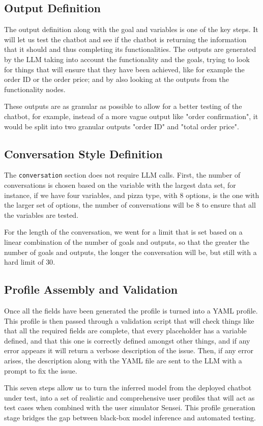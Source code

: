 \subsection{Output Definition}

The output definition along with the goal and variables is one of the key steps.
It will let us test the chatbot
and see if the chatbot is returning the information that it should
and thus completing its functionalities.
The outputs are generated by the \ac{LLM}
taking into account the functionality and the goals,
trying to look for things that will ensure that they have been achieved,
like for example the order ID or the order price;
and by also looking at the outputs from the functionality nodes.

These outputs are as granular as possible
to allow for a better testing of the chatbot,
for example, instead of a more vague output like
"order confirmation", it would be split into two granular outputs
"order ID" and "total order price".

\subsection{Conversation Style Definition}

The \texttt{conversation} section does not require \ac{LLM} calls.
First, the number of conversations is chosen
based on the variable with the largest data set,
for instance, if we have four variables,
and pizza type, with $8$ options, is the one with the larger set of options,
the number of conversations will be $8$ to ensure that all the variables are tested.

For the length of the conversation,
we went for a limit that is set based
on a linear combination of the number of goals and outputs,
so that the greater the number of goals and outputs,
the longer the conversation will be,
but still with a hard limit of $30$.

\subsection{Profile Assembly and Validation}

Once all the fields have been generated
the profile is turned into a YAML profile.
This profile is then passed through a validation script
that will check things like that all the required fields are complete,
that every placeholder has a variable defined,
and that this one is correctly defined
amongst other things,
and if any error appears it will return a verbose description of the issue.
Then, if any error arises, the description along with the YAML file
are sent to the \ac{LLM} with a prompt to fix the issue.


This seven steps allow us to turn the inferred model
from the deployed chatbot under test,
into a set of realistic and comprehensive user profiles
that will act as test cases when combined with the user simulator Sensei.
This profile generation stage bridges the gap between
black-box model inference and automated testing.
